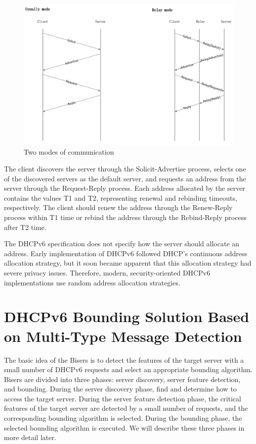\documentclass[conference]{IEEEtran}
\begin{document}
\begin{figure}[htbp]
  \centerline{\includegraphics[scale=0.4]{relay.png}}
  \caption{Two modes of communication}
  \label{figRelay}
\end{figure}

The client discovers the server through the Solicit-Advertise process,
selects one of the discovered servers as the default server, and
requests an address from the server through the Request-Reply
process. Each address allocated by the server contains the values T1
and T2, representing renewal and rebinding timeouts, respectively. The
client should renew the address through the Renew-Reply process within
T1 time or rebind the address through the Rebind-Reply process after
T2 time.

The DHCPv6 specification does not specify how the server should
allocate an address. Early implementation of DHCPv6 followed DHCP's
continuous address allocation strategy, but it soon became apparent
that this allocation strategy had severe privacy issues. Therefore,
modern, security-oriented DHCPv6 implementations use random address
allocation strategies.

\section{DHCPv6 Bounding Solution Based on Multi-Type Message Detection}

The basic idea of the Bisers is to detect the features of the target
server with a small number of DHCPv6 requests and select an
appropriate bounding algorithm. Bisers are divided into three phases:
server discovery, server feature detection, and bounding. During the
server discovery phase, find and determine how to access the target
server. During the server feature detection phase, the critical
features of the target server are detected by a small number of
requests, and the corresponding bounding algorithm is selected. During
the bounding phase, the selected bounding algorithm is executed. We
will describe these three phases in more detail later.
\end{document}
